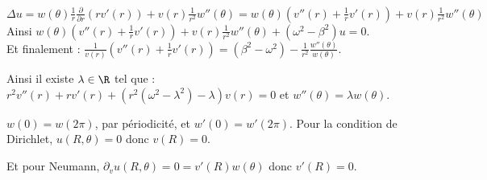 \documentclass[12pt,a4paper]{article}
\begin{document}
	\begin{sol}
		$ $\\
		\begin{enumerate}
			\begin{minipage}{17cm}
				\item $\Delta u = w(\theta)\frac1r\frac{\partial}{\partial r}\left(rv'(r)\right) + v(r)\frac1{r^2}w''(\theta) = w(\theta)(v''(r)+\frac1r v'(r)) + v(r)\frac1{r^2}w''(\theta)$\\
				
				Ainsi $w(\theta)(v''(r)+\frac1r v'(r)) + v(r)\frac1{r^2}w''(\theta) + (\omega^2-\beta^2)u = 0$.\\
				
				Et finalement : $\frac1{v(r)}(v''(r)+\frac1r v'(r)) = (\beta^2-\omega^2) - \frac1{r^2}\frac{w''(\theta)}{w(\theta)}$.
				
				Ainsi il existe $\lambda \in \R$ tel que : $r^2v''(r)+r v'(r) + (r^2(\omega^2-\lambda^2)-\lambda) v(r) = 0$ et $w''(\theta) = \lambda w(\theta)$.
				
				\item $w(0) = w(2\pi)$, par périodicité, et $w'(0) = w'(2\pi)$. Pour la condition de Dirichlet, $u(R,\theta) = 0$ donc $v(R) = 0$.
				
				Et pour Neumann, $\partial_v u(R,\theta) = 0 = v'(R) w(\theta)$ donc $v'(R) = 0$.
			\end{minipage}
		\end{enumerate}
	\end{sol}
	
\end{document}
